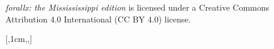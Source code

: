 \documentclass[bleedwidth=6.35mm, marklength=0mm, coverheight=228.6mm, coverwidth=152.4mm, spinewidth=12.3mm]{bookcover} %
\begin{document}
\begin{bookcover}
{\quad \textit{forallx: the Missississippi edition} is licensed under a Creative Commons Attribution 4.0 International (CC BY 4.0) license.  
}



[,1cm,,]{
\vfill
\centering\textcolor{forallx-orange}{
\colorbox{white}{%
}}}


\end{bookcover}
\end{document}
